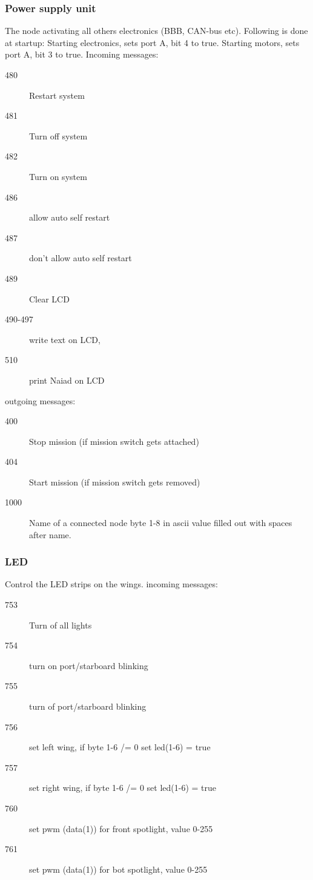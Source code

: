 \subsubsection{Power supply unit}
The node activating all others electronics (BBB, CAN-bus etc).
Following is done at startup: \newline
Starting electronics, sets port A, bit 4 to true. \newline
Starting motors, sets port A, bit 3 to true. \newline
Incoming messages:\newline
\begin{description}
  \item[480] Restart system
  \item[481] Turn off system
  \item[482] Turn on system
  \item[486] allow auto self restart
  \item[487] don't allow auto self restart
  \item[489] Clear LCD
  \item[490-497] write text on LCD, 
  \item[510] print Naiad on LCD
\end{description}
outgoing messages:
\begin{description}
  \item[400] Stop mission (if mission switch gets attached) %
  \item[404] Start mission (if mission switch gets removed)
  \item[1000] Name of a connected node byte 1-8 in ascii value filled out with spaces after name.
\end{description}



\subsubsection{LED}
Control the LED strips on the wings.
incoming messages:
\begin{description}
  \item[753] Turn of all lights
  \item[754] turn on port/starboard blinking
  \item[755] turn of port/starboard blinking
  \item[756] set left wing, if byte 1-6 /= 0 set led(1-6) = true
  \item[757] set right wing, if byte 1-6 /= 0 set led(1-6) = true
  \item[760] set pwm (data(1)) for front spotlight, value 0-255
  \item[761] set pwm (data(1)) for bot spotlight, value 0-255
\end{description}

